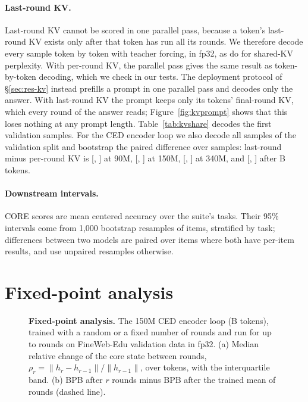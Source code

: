 \paragraph{Last-round KV.} Last-round KV cannot be scored in one parallel pass, because a token's last-round KV
exists only after that token has run all its rounds. We therefore decode every sample token by token with teacher
forcing, in fp32, as \citet{benice} do for shared-KV perplexity. With per-round KV, the parallel pass gives the
same result as token-by-token decoding, which we check in our tests. The deployment protocol of \S\ref{sec:res-kv}
instead prefills a prompt in one parallel pass and decodes only the answer. With last-round KV the prompt keeps only its tokens' final-round KV,
which every round of the answer reads; Figure~\ref{fig:kvprompt} shows that this loses nothing at any prompt length. Table~\ref{tab:kvshare} decodes the
first  validation samples. For the CED encoder loop we also decode all
 samples of the validation split and bootstrap the paired difference over samples: last-round
minus per-round KV is  [,
] at 90M, 
[, ] at 150M,
 [, ]
at 340M, and  [,
] after B tokens.

\paragraph{Downstream intervals.} CORE scores are mean centered accuracy over the suite's tasks. Their 95\%
intervals come from 1,000 bootstrap resamples of items, stratified by task; differences between two models are paired
over items where both have per-item results, and use unpaired resamples otherwise.

\section{Fixed-point analysis}
\label{app:fixedpoint}

\begin{figure}[t]
\centering
{}
\caption{\textbf{Fixed-point analysis.} The 150M CED encoder loop (B tokens), trained with a
random or a fixed number of rounds and run for up to  rounds on FineWeb-Edu validation data in fp32. (a) Median relative
change of the core state between rounds, $\rho_r = \lVert h_r - h_{r-1}\rVert / \lVert h_{r-1}\rVert$, over tokens,
with the interquartile band. (b) BPB after $r$ rounds minus BPB after the trained mean of  rounds
(dashed line).}
\label{fig:fixedpoint}
\end{figure}

